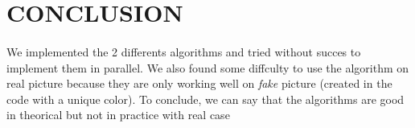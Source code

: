 \section{CONCLUSION}

\paragraph{}
We implemented the 2 differents algorithms and tried without succes to implement them in parallel. We also found some diffculty to use the algorithm on real picture because they are only working well on \textit{fake} picture (created in the code with a unique color). To conclude, we can say that the algorithms are good in theorical but not in practice with real case